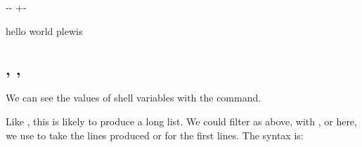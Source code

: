 \documentclass[letterpaper,10pt,english]{sphinxmanual}
\newlength\nbsphinxcodecellspacing
\begin{document}
{

\kern-\sphinxverbatimsmallskipamount\kern-\baselineskip
\kern+\FrameHeightAdjust\kern-\fboxrule
\vspace{\nbsphinxcodecellspacing}

\begin{sphinxVerbatim}[commandchars=\\\{\}]
hello world plewis
\end{sphinxVerbatim}
}


\subsection{,  , }
\label{\detokenize{Appendix1:set,-head-,-tail}}
We can see the values of shell variables with the  command.

Like , this is likely to produce a long list. We could filter as above, with , or here, we use  to take the   lines produced or  for the first  lines. The syntax is:

\begin{sphinxVerbatim}[commandchars=\\\{\}]
 
 
\end{sphinxVerbatim}
\end{document}
